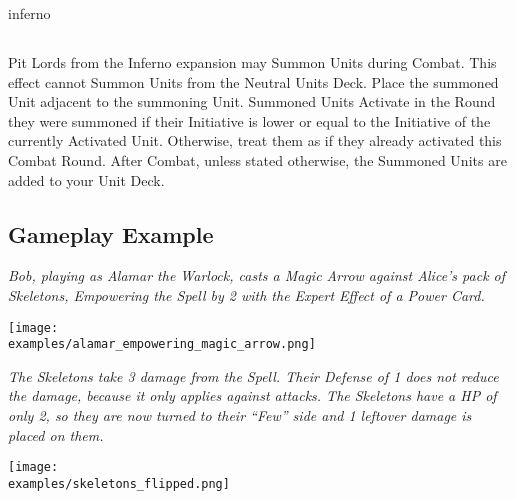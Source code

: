 \begin{multicols*}{2}

\begin{expansion}{inferno}
  \subsection*{}
  Pit Lords from the Inferno expansion may Summon Units during Combat.
  This effect cannot Summon Units from the Neutral Units Deck.
  Place the summoned Unit adjacent to the summoning Unit.
  Summoned Units Activate in the Round they were summoned if their Initiative is lower or equal to the Initiative of the currently Activated Unit.
  Otherwise, treat them as if they already activated this Combat Round.
  After Combat, unless stated otherwise, the Summoned Units are added to your Unit Deck.
\end{expansion}
\vspace*{\fill}

\subsection*{Gameplay Example}

\textit{Bob, playing as Alamar the Warlock, casts a Magic Arrow against Alice's pack of Skeletons, Empowering  the Spell by 2 with the Expert  Effect  of a Power Card.}

\medskip

\texttt{[image: \\examples/alamar\_empowering\_magic\_arrow.png]}

\medskip

\textit{The Skeletons take 3 damage  from the Spell.
  Their Defense  of 1 does not reduce the damage, because it only applies against attacks.
  The Skeletons have a HP  of only 2, so they are now turned to their ``Few'' side and 1 leftover damage  is placed on them.
}

\bigskip

\texttt{[image: \\examples/skeletons\_flipped.png]}

\end{multicols*}

